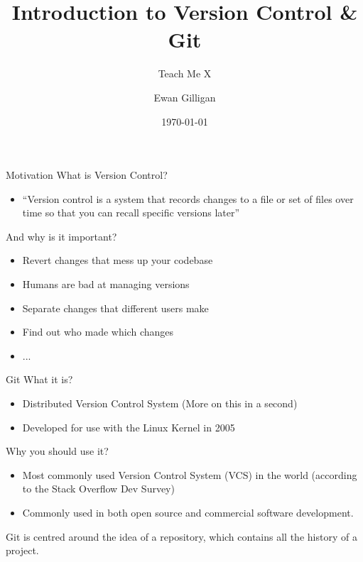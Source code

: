 \documentclass{beamer}
\title{Introduction to Version Control \& Git}
\subtitle{Teach Me X}
\author{Ewan Gilligan}
\date{\today}
\begin{document}

\begin{frame}
	\maketitle %
\end{frame}

\begin{frame}{Motivation}
What is Version Control?
    \begin{itemize}
        \item ``Version control is a system that records changes to a file or set of files over time so that you can recall specific versions later'' \cite{10.5555/2695634}
    \end{itemize}
And why is it important?
    \begin{itemize}
        \item Revert changes that mess up your codebase
        \item Humans are bad at managing versions
        \item Separate changes that different users make
        \item Find out who made which changes
        \item ...
    \end{itemize}
\end{frame}

\begin{frame}{Git}
What it is?
\begin{itemize}
    \item Distributed Version Control System (More on this in a second)
    \item Developed for use with the Linux Kernel in 2005
\end{itemize}
Why you should use it?
\begin{itemize}
    \item Most commonly used Version Control System (VCS) in the world (according to the Stack Overflow Dev Survey)
    \item Commonly used in both open source and commercial software development.
\end{itemize}
Git is centred around the idea of a repository, which contains all the history of a project.
    
\end{frame}
\end{document}
